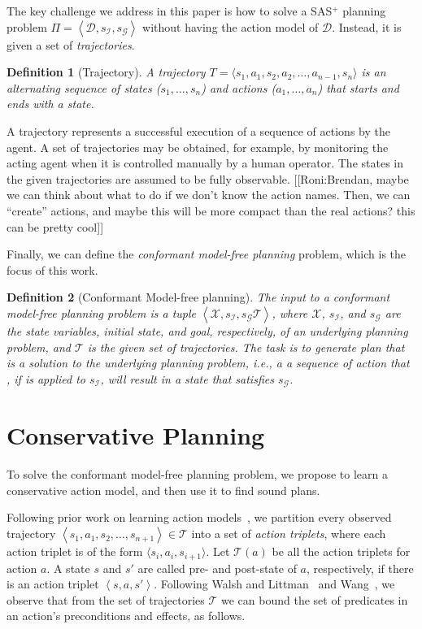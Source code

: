 \documentclass[letterpaper]{article}
\newtheorem{definition}{Definition}
\newcommand{\tuple}[1]{\ensuremath{\left \langle #1 \right \rangle }}
\newcommand{\SAS}{SAS$^+$}
\newcommand{\roni}[1]{[[Roni:#1]]}
\begin{document}
The key challenge we address in this paper is how to solve a \SAS{} 
planning problem $\Pi=\tuple{\mathcal{D},s_\mathcal{I}, s_\mathcal{G}}$ without having the action model of $\mathcal{D}$. Instead, it is given a set of {\em trajectories}. 
\begin{definition}[Trajectory]
A trajectory $T=\langle s_1, a_1, s_2, a_2, \ldots, a_{n-1}, s_n\rangle$ is an alternating sequence of states ($s_1,\ldots,s_n$) and actions ($a_1,\ldots,a_n$) that starts and ends with a state. 
\end{definition}
A trajectory represents a successful execution of a sequence of actions by the agent. A set of trajectories may be obtained, for example, by monitoring the acting agent when it is controlled manually by a human operator. The states in the given trajectories are assumed to be fully observable. 
\roni{Brendan, maybe we can think about what to do if we don't know the action names. Then, we can ``create'' actions, and maybe this will be more compact than the real actions? this can be pretty cool}

Finally, we can define the {\em conformant model-free planning} problem, which is the focus of this work. 
\begin{definition}[Conformant Model-free planning]
The input to a conformant model-free planning problem is a tuple $\tuple{\mathcal{X},s_\mathcal{I}, s_\mathcal{G} \mathcal{T}}$, 
where $\mathcal{X}$, $s_\mathcal{I}$, and $s_\mathcal{G}$ are the state variables, initial state, and goal, respectively, of an underlying planning problem, and $\mathcal{T}$ is the given set of trajectories. The task is to generate plan that is a solution to the underlying planning problem, i.e.,  a a sequence of action that , if is applied to $s_\mathcal{I}$, will result in a state that satisfies $s_\mathcal{G}$.
\label{def:model-free-planning}
\end{definition}


\section{Conservative Planning}
To solve the conformant model-free planning problem, we propose to learn a conservative action model, and then use it to find sound plans.

Following prior work on learning action models~\cite{wang1995learning,wang1994learning,walsh2008efficientLearning}, we partition every observed trajectory $\tuple{s_1,a_1,s_2,\ldots,s_{n+1}}\in\mathcal{T}$ into a set of {\em action triplets}, where each action triplet is of the form $\langle s_i, a_i, s_{i+1}\rangle$. 
    Let $\mathcal{T}(a)$ be all the action triplets for action $a$. 
    A state $s$ and $s'$ are called pre- and post-state of $a$, respectively, if there is an action triplet $\tuple{s,a,s'}$. Following Walsh and Littman~ and Wang~, we observe that from the set of trajectories $\mathcal{T}$ we can bound the set of predicates in an action's preconditions and effects, as follows. 
    
\end{document}
